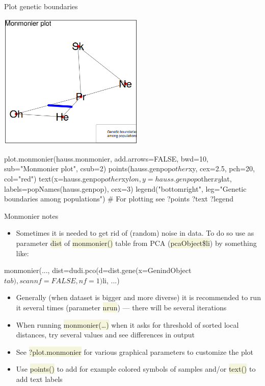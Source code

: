 \documentclass[compress, ucs, xelatex, 11pt, xcolor=svgnames, aspectratio=169,
	hyperref={
		bookmarks=true,
		unicode=true,
		colorlinks=true,
		pdftitle={Molecular data in R},
		plainpages=false,
		pdfauthor={Vojtech Zeisek},
		pdfsubject={Course about phylogeny and evolution in R},
		pdfcreator={XeLaTeX},
		pdfkeywords={R, evolution, phylogeny, molecular data},
		linkcolor=Crimson, %
		anchorcolor=Magenta, %
		citecolor=Magenta, %
		filecolor=Magenta, %
		menucolor=Magenta, %
		urlcolor=DodgerBlue, %
		pdftex},
	url={hyphens, lowtilde} %
	]{beamer}
\renewcommand{\texttt}[1]{\colorbox{Beige}{{\ttfamily #1}}}
\begin{document}
\begin{frame}[fragile]{Plot genetic boundaries}
	\begin{multicols}{2}
		\begin{center}
			\includegraphics[height=6.5cm]{monmonier.png}
		\end{center}
		\begin{spluscode}
    plot.monmonier(hauss.monmonier,
      add.arrows=FALSE, bwd=10,
      sub="Monmonier plot", csub=2)
    points(hauss.genpop$other$xy,
      cex=2.5, pch=20, col="red")
    text(x=hauss.genpop$other$xy$lon,
      y=hauss.genpop$other$xy$lat,
      labels=popNames(hauss.genpop),
      cex=3)
    legend("bottomright",
      leg="Genetic boundaries\n
      among populations")
    # For plotting see
    ?points
    ?text
    ?legend
		\end{spluscode}
	\end{multicols}
\end{frame}

\begin{frame}[fragile]{Monmonier notes}
	\begin{itemize}
		\item Sometimes it is needed to get rid of (random) noise in data. To do so use as parameter \texttt{dist} of \texttt{monmonier()} table from PCA (\texttt{pcaObject\$li}) by something like:
	\end{itemize}
	\begin{spluscode}
    monmonier(..., dist=dudi.pco(d=dist.gene(x=GenindObject$tab),
      scannf=FALSE, nf=1)$li, ...)
	\end{spluscode}
	\begin{itemize}
		\item Generally (when dataset is bigger and more diverse) it is recommended to run it several times (parameter \texttt{nrun}) --- there will be several iterations
		\item When running \texttt{monmonier(\ldots)} when it asks for threshold of sorted local distances, try several values and see differences in output
		\item See \texttt{?plot.monmonier} for various graphical parameters to customize the plot
		\item Use \texttt{points()} to add for example colored symbols of samples and/or \texttt{text()} to add text labels
	\end{itemize}
\end{frame}
\end{document}
